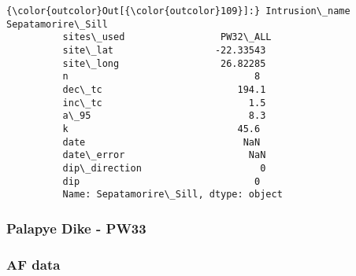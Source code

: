 \documentclass{article}
\begin{document}
            \begin{Verbatim}[commandchars=\\\{\}]
{\color{outcolor}Out[{\color{outcolor}109}]:} Intrusion\_name    Sepatamorire\_Sill
          sites\_used                 PW32\_ALL
          site\_lat                  -22.33543
          site\_long                  26.82285
          n                                 8
          dec\_tc                        194.1
          inc\_tc                          1.5
          a\_95                            8.3
          k                              45.6
          date                            NaN
          date\_error                      NaN
          dip\_direction                     0
          dip                               0
          Name: Sepatamorire\_Sill, dtype: object
\end{Verbatim}
        
    \subsubsection{Palapye Dike - PW33}\label{palapye-dike---pw33}

    \subsubsection{AF data}\label{af-data}
\end{document}
